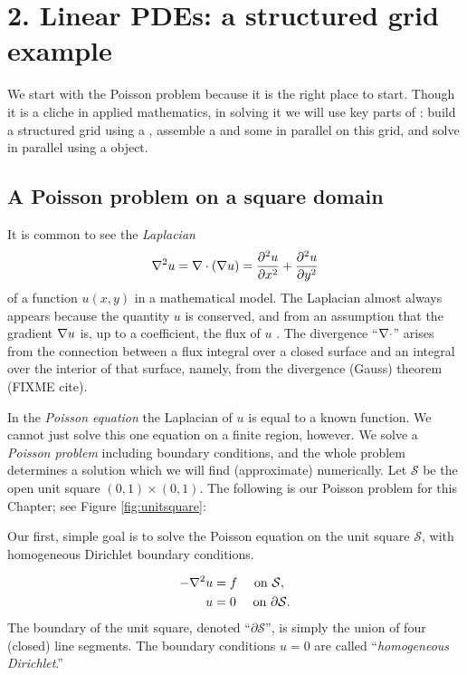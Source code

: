 
\chapter{2. Linear PDEs: a structured grid example}

We start with the Poisson problem because it is the right place to start.  Though it is a cliche in applied mathematics, in solving it we will use key parts of \PETSc: build a structured grid using a \PETSc \pDMDA, assemble a \pMat and some \pVecs in parallel on this grid, and solve in parallel using a \pKSP object.

\section{A Poisson problem on a square domain}

It is common to see the \emph{Laplacian}
    $$\nabla^2 u = \nabla\cdot(\nabla u) = \frac{\partial^2 u}{\partial x^2} + \frac{\partial^2 u}{\partial y^2}$$
of a function $u(x,y)$ in a mathematical model.  The Laplacian almost always appears because the quantity $u$ is conserved, and from an assumption that the gradient $\nabla u$ is, up to a coefficient, the flux of $u$ \citep{Ockendonetal2003}.  The divergence ``$\nabla\cdot$'' arises from the connection between a flux integral over a closed surface and an integral over the interior of that surface, namely, from the divergence (Gauss) theorem (FIXME cite).

In the \emph{Poisson equation} the Laplacian of $u$ is equal to a known function.  We cannot just solve this one equation on a finite region, however.  We solve a \emph{Poisson problem} including boundary conditions, and the whole problem determines a solution which we will find (approximate) numerically.  Let $\mathcal{S}$ be the open unit square $(0,1)\times(0,1)$.  The following is our Poisson problem for this Chapter;  see Figure \ref{fig:unitsquare}:
\begin{marginfigure}
\caption{Our first, simple goal is to solve the Poisson equation on the unit square $\mathcal{S}$, with homogeneous Dirichlet boundary conditions.}
\label{fig:unitsquare}
\end{marginfigure}
\begin{align}
- \nabla^2 u &= f \quad \text{ on } \mathcal{S}, \label{poissonsquare} \\
u &= 0 \quad \text{ on } \partial \mathcal{S}. \notag
\end{align}
The boundary of the unit square, denoted ``$\partial\mathcal{S}$'', is simply the union of four (closed) line segments.  The boundary conditions $u=0$ are called ``\emph{homogeneous Dirichlet}.''

